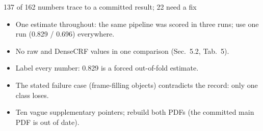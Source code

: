 
\begin{frame}{137 of 162 numbers trace to a committed result; 22 need a fix}
\begin{itemize}
\item One estimate throughout: the same pipeline was scored in three runs; use one run (0.829 / 0.696) everywhere.
\item No raw and DenseCRF values in one comparison (Sec.~5.2, Tab.~5).
\item Label every number: 0.829 is a forced out-of-fold estimate.
\item The stated failure case (frame-filling objects) contradicts the record: only one class loses.
\item Ten vague supplementary pointers; rebuild both PDFs (the committed main PDF is out of date).
\end{itemize}
\end{frame}
